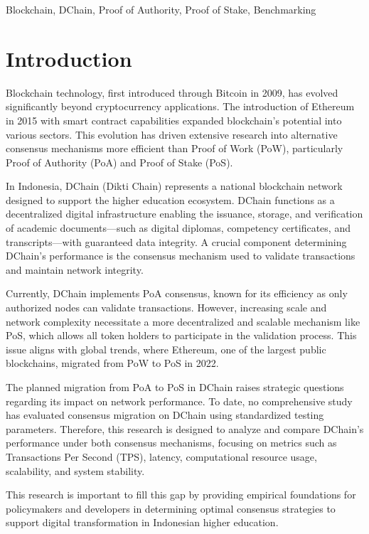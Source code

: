 \documentclass[conference]{IEEEtran}
\begin{document}
\begin{IEEEkeywords}
Blockchain, DChain, Proof of Authority, Proof of Stake, Benchmarking
\end{IEEEkeywords}

\section{Introduction}

Blockchain technology, first introduced through Bitcoin in 2009, has evolved significantly beyond cryptocurrency applications. The introduction of Ethereum in 2015 with smart contract capabilities expanded blockchain's potential into various sectors. This evolution has driven extensive research into alternative consensus mechanisms more efficient than Proof of Work (PoW), particularly Proof of Authority (PoA) and Proof of Stake (PoS).

In Indonesia, DChain (Dikti Chain) represents a national blockchain network designed to support the higher education ecosystem. DChain functions as a decentralized digital infrastructure enabling the issuance, storage, and verification of academic documents---such as digital diplomas, competency certificates, and transcripts---with guaranteed data integrity. A crucial component determining DChain's performance is the consensus mechanism used to validate transactions and maintain network integrity.

Currently, DChain implements PoA consensus, known for its efficiency as only authorized nodes can validate transactions. However, increasing scale and network complexity necessitate a more decentralized and scalable mechanism like PoS, which allows all token holders to participate in the validation process. This issue aligns with global trends, where Ethereum, one of the largest public blockchains, migrated from PoW to PoS in 2022.

The planned migration from PoA to PoS in DChain raises strategic questions regarding its impact on network performance. To date, no comprehensive study has evaluated consensus migration on DChain using standardized testing parameters. Therefore, this research is designed to analyze and compare DChain's performance under both consensus mechanisms, focusing on metrics such as Transactions Per Second (TPS), latency, computational resource usage, scalability, and system stability.

This research is important to fill this gap by providing empirical foundations for policymakers and developers in determining optimal consensus strategies to support digital transformation in Indonesian higher education.
\end{document}
